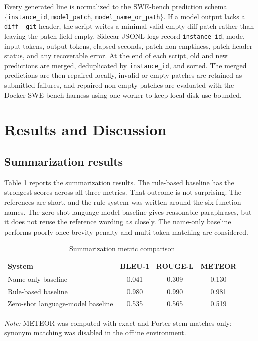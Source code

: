 \documentclass[preprint,12pt]{elsarticle}
\begin{document}
Every generated line is normalized to the SWE-bench prediction schema \{\texttt{instance\_id}, \texttt{model\_patch}, \texttt{model\_name\_or\_path}\}. If a model output lacks a \texttt{diff --git} header, the script writes a minimal valid empty-diff patch rather than leaving the patch field empty. Sidecar JSONL logs record \texttt{instance\_id}, mode, input tokens, output tokens, elapsed seconds, patch non-emptiness, patch-header status, and any recoverable error. At the end of each script, old and new predictions are merged, deduplicated by \texttt{instance\_id}, and sorted. The merged predictions are then repaired locally, invalid or empty patches are retained as submitted failures, and repaired non-empty patches are evaluated with the Docker SWE-bench harness using one worker to keep local disk use bounded.

\section{Results and Discussion}

\subsection{Summarization results}

Table \ref{tab:summary} reports the summarization results. The rule-based baseline has the strongest scores across all three metrics. That outcome is not surprising. The references are short, and the rule system was written around the six function names. The zero-shot language-model baseline gives reasonable paraphrases, but it does not reuse the reference wording as closely. The name-only baseline performs poorly once brevity penalty and multi-token matching are considered.

\begin{table}[htbp]
\centering
\caption{Summarization metric comparison}
\label{tab:summary}
\begin{tabular}{lccc}
\toprule
System & BLEU-1 & ROUGE-L & METEOR \\
\midrule
Name-only baseline & 0.041 & 0.309 & 0.130 \\
Rule-based baseline & 0.980 & 0.990 & 0.981 \\
Zero-shot language-model baseline & 0.535 & 0.565 & 0.519 \\
\bottomrule
\end{tabular}
\vspace{0.5mm}
\begin{minipage}{0.88\linewidth}
\footnotesize\textit{Note:} METEOR was computed with exact and Porter-stem matches only; synonym matching was disabled in the offline environment.
\end{minipage}
\end{table}
\end{document}
